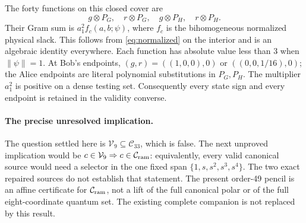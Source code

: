 \documentclass[10pt]{article}
\newcommand{\V}{\mathcal V_9}
\newcommand{\Cq}{\mathcal C_{33}}
\newcommand{\Cr}{\mathcal C_{\rm ram}}
\begin{document}
The forty functions on this closed cover are
\[
                 g\otimes P_G,\quad r\otimes P_G,
                 \quad g\otimes P_H,\quad r\otimes P_H.
\]
Their Gram sum is $a_1^2f_c(a,b;\psi)$, where $f_c$ is the bihomogeneous
normalized physical slack. This follows from \eqref{eq:normalized} on the
interior and is an algebraic identity everywhere. Each function has absolute
value less than $3$ when $\|\psi\|=1$. At Bob's endpoints,
$(g,r)=((1,0,0),0)$ or $((0,0,1/16),0)$; the Alice endpoints are literal
polynomial substitutions in $P_G,P_H$. The multiplier $a_1^2$ is positive
on a dense testing set. Consequently every state sign and every endpoint
is retained in the validity converse.

\paragraph{The precise unresolved implication.}
The question settled here is $\V\subseteq\Cq$, which is false. The next
unproved implication would be $c\in\V\Rightarrow c\in\Cr$: equivalently,
every valid canonical source would need a selector in the one fixed span
$\{1,s,s^2,s^3,s^4\}$. The two exact repaired sources do not establish that
statement. The present order-49 pencil is an affine certificate for
$\Cr$, not a lift of the full canonical polar or of the full
eight-coordinate quantum set. The existing complete companion is not
replaced by this result.

\appendix
\end{document}
